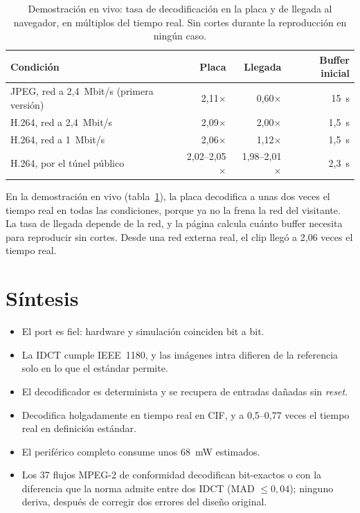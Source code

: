 \begin{table}[ht]
  \centering\small
  \begin{tabular}{@{}l r r r@{}}
    \toprule
    \textbf{Condición} & \textbf{Placa} & \textbf{Llegada} & \textbf{Buffer inicial} \\
    \midrule
    JPEG, red a 2,4~Mbit/s (primera versión) & 2,11$\times$ & 0,60$\times$ & 15~s \\
    H.264, red a 2,4~Mbit/s                  & 2,09$\times$ & 2,00$\times$ & 1,5~s \\
    H.264, red a 1~Mbit/s                    & 2,06$\times$ & 1,12$\times$ & 1,5~s \\
    H.264, por el túnel público              & 2,02--2,05$\times$ & 1,98--2,01$\times$ & 2,3~s \\
    \bottomrule
  \end{tabular}
  \caption{Demostración en vivo: tasa de decodificación en la placa y de
    llegada al navegador, en múltiplos del tiempo real. Sin cortes durante la
    reproducción en ningún caso.}
  \label{tab:demo}
\end{table}

En la demostración en vivo (tabla~\ref{tab:demo}), la placa decodifica a
unas dos veces el tiempo real en todas las condiciones, porque ya no la
frena la red del visitante. La tasa de llegada depende de la red, y la
página calcula cuánto buffer necesita para reproducir sin cortes. Desde una
red externa real, el clip llegó a 2,06 veces el tiempo real.

\section{Síntesis}

\begin{itemize}
  \item El port es fiel: hardware y simulación coinciden bit a bit.
  \item La IDCT cumple IEEE~1180, y las imágenes intra difieren de la
    referencia solo en lo que el estándar permite.
  \item El decodificador es determinista y se recupera de entradas dañadas
    sin \emph{reset}.
  \item Decodifica holgadamente en tiempo real en CIF, y a 0,5--0,77 veces el
    tiempo real en definición estándar.
  \item El periférico completo consume unos 68~mW estimados.
  \item Los 37 flujos MPEG-2 de conformidad decodifican bit-exactos o con
    la diferencia que la norma admite entre dos IDCT (MAD $\leq 0{,}04$);
    ninguno deriva, después de corregir dos errores del diseño original.
\end{itemize}

